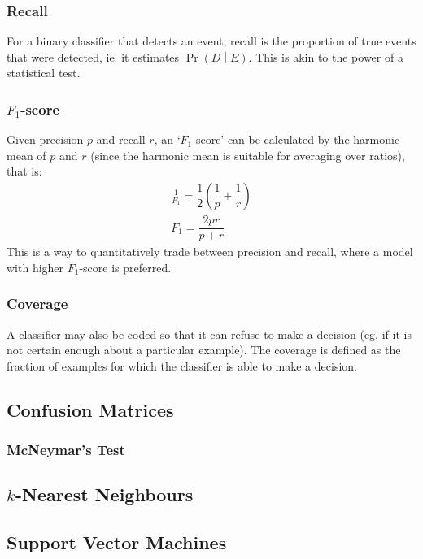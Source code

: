 \documentclass[11pt]{report} %
\begin{document}
\subsubsection{Recall}

For a binary classifier that detects an event, recall is the proportion of true events that were detected, ie. it estimates $\operatorname{Pr}\left(D\middle|E\right)$. This is akin to the power of a statistical test.

\subsubsection{$F_{1}$-score}

Given precision $p$ and recall $r$, an `$F_{1}$-score' can be calculated by the harmonic mean of $p$ and $r$ (since the harmonic mean is suitable for averaging over ratios), that is:
\begin{gather}
\frac{1}{F_{1}} = \dfrac{1}{2}\left(\dfrac{1}{p} + \dfrac{1}{r}\right) \\
F_{1} = \dfrac{2pr}{p + r}
\end{gather}
This is a way to quantitatively trade between precision and recall, where a model with higher $F_{1}$-score is preferred.

\subsubsection{Coverage}

A classifier may also be coded so that it can refuse to make a decision (eg. if it is not certain enough about a particular example). The coverage is defined as the fraction of examples for which the classifier is able to make a decision.

\subsection{Confusion Matrices}

\subsubsection{McNeymar's Test}

\subsection{$k$-Nearest Neighbours}

\subsection{Support Vector Machines}
\end{document}
